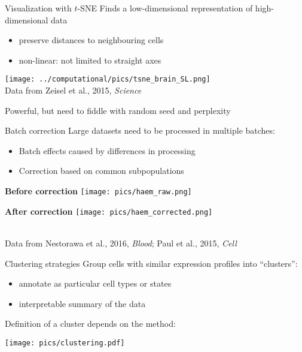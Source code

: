 \documentclass{beamer}
\begin{document}
\begin{frame}{Visualization with $t$-SNE}
Finds a low-dimensional representation of high-dimensional data 
\begin{itemize}
    \item preserve distances to neighbouring cells
    \item non-linear: not limited to straight axes
\end{itemize}
\begin{center}
    \texttt{[image: ../computational/pics/tsne\_brain\_SL.png]} \\
    {\tiny Data from Zeisel et al., 2015, \textit{Science}}
\end{center}
Powerful, but need to fiddle with random seed and perplexity
\end{frame}

\begin{frame}{Batch correction}
Large datasets need to be processed in multiple batches: 
\begin{itemize}
\item Batch effects caused by differences in processing
\item Correction based on common subpopulations
\end{itemize}
\vspace{0.1in}
\begin{minipage}{0.49\textwidth}
\begin{flushleft}
\textbf{Before correction}
\texttt{[image: pics/haem\_raw.png]} \\
\end{flushleft}
\end{minipage}
\begin{minipage}{0.49\textwidth}
\begin{flushleft}
\textbf{After correction}
\texttt{[image: pics/haem\_corrected.png]} \\
\end{flushleft}
\end{minipage}
\\[0.1in]
{\tiny Data from Nestorawa et al., 2016, \textit{Blood}; Paul et al., 2015, \textit{Cell}}
\end{frame}

\begin{frame}{Clustering strategies}
Group cells with similar expression profiles into ``clusters'': 
\begin{itemize}
\item annotate as particular cell types or states
\item interpretable summary of the data
\end{itemize}
\vspace{0.1in}
Definition of a cluster depends on the method:
\begin{center}
\texttt{[image: pics/clustering.pdf]}
\end{center}
\end{frame}
\end{document}
